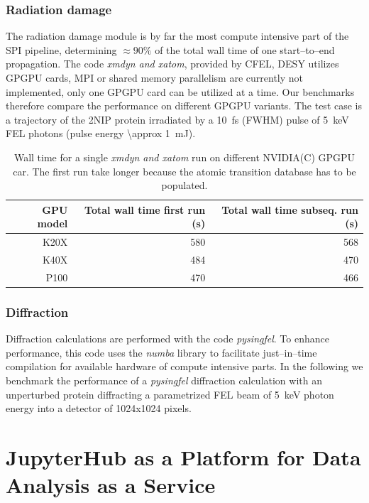 \documentclass[10pt]{scrartcl}
\begin{document}
\subsubsection{Radiation damage}
The radiation damage module is by far the most compute intensive part of the SPI
pipeline, determining $\approx 90\%$ of the total wall time of one
start--to--end propagation. The code \textit{xmdyn and xatom}, provided by
CFEL, DESY \cite{Jurek2016} utilizes GPGPU cards, MPI or shared memory
parallelism are currently not implemented, only one GPGPU card can
be utilized at a time. Our benchmarks therefore compare the performance on
different GPGPU variants. The test case is a trajectory of the 2NIP protein
irradiated by a \SI{10}{\femto\second} (FWHM) pulse of
\SI{5}{\kilo\electronvolt} FEL photons (pulse energy \SI{\approx 1}{\milli\joule}).
%
\begin{table}
  \centering
  \begin{tabular}{rrr}
    \textbf{GPU model} & \textbf{Total wall time first run (s)} & \textbf{Total
    wall time subseq. run (s)}\\
    \hline
    K20X  & 580 & 568 \\
    K40X  & 484 & 470 \\
    P100  & 470 & 466 \\
  \end{tabular}
  \caption{Wall time for a single \textit{xmdyn and xatom} run on different
NVIDIA(C) GPGPU car. The first run take longer because the atomic transition database
has to be populated.}
  \label{tab:xmdyn_performance_nvidia}
\end{table}
%
\subsubsection{Diffraction}
%
Diffraction calculations are performed with the code \textit{pysingfel}. To
enhance performance, this code uses the \textit{numba} library to facilitate
just--in--time compilation for available hardware of compute intensive parts.
In the following we benchmark the performance of a \textit{pysingfel} diffraction
calculation with an unperturbed protein diffracting a parametrized FEL beam of
\SI{5}{\kilo\electronvolt} photon energy into a detector of 1024x1024 pixels.

\section{JupyterHub as a Platform for Data Analysis as a Service}
\end{document}
